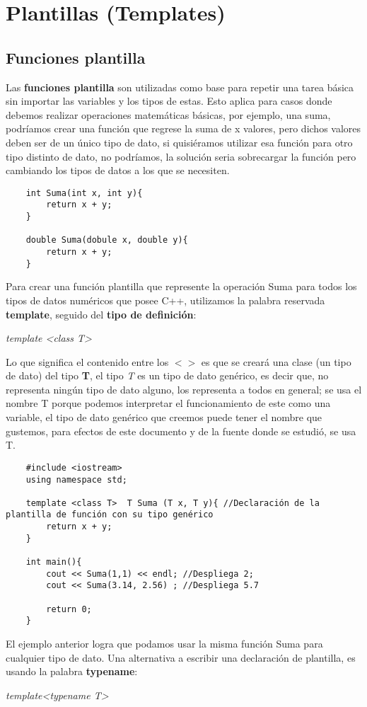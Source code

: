 \section{Plantillas (Templates)}

\subsection{Funciones plantilla}
Las \textbf{funciones plantilla} son utilizadas como base para repetir una tarea básica sin importar las variables y los tipos de estas. Esto aplica para casos donde debemos realizar operaciones matemáticas básicas, por ejemplo, una suma, podríamos crear una función que regrese la suma de x valores, pero dichos valores deben ser de un único tipo de dato, si quisiéramos utilizar esa función para otro tipo distinto de dato, no podríamos, la solución seria sobrecargar la función pero cambiando los tipos de datos a los que se necesiten.
\begin{lstlisting}
    int Suma(int x, int y){
        return x + y;
    }
    
    double Suma(dobule x, double y){
        return x + y;
    }
\end{lstlisting}
Para crear una función plantilla que represente la operación Suma para todos los tipos de datos numéricos que posee C++, utilizamos la palabra reservada \textbf{template}, seguido del \textbf{tipo de definición}:\begin{center}\textit{template <class T>}\end{center}
Lo que significa el contenido entre los \textbf{$< >$} es que se creará una clase (un tipo de dato) del tipo \textbf{T}, el tipo \textit{T} es un tipo de dato genérico, es decir que, no representa ningún tipo de dato alguno, los representa a todos en general; se usa el nombre T porque podemos interpretar el funcionamiento de este como una variable, el tipo de dato genérico que creemos puede tener el nombre que gustemos, para efectos de este documento y de la fuente donde se estudió, se usa T.
\begin{lstlisting}
    #include <iostream>
    using namespace std;
    
    template <class T>  T Suma (T x, T y){ //Declaración de la plantilla de función con su tipo genérico
        return x + y;
    }
    
    int main(){
        cout << Suma(1,1) << endl; //Despliega 2;
        cout << Suma(3.14, 2.56) ; //Despliega 5.7
        
        return 0;
    }
\end{lstlisting}
El ejemplo anterior logra que podamos usar la misma función Suma para cualquier tipo de dato. Una alternativa a escribir una declaración de plantilla, es usando la palabra \textbf{typename}:\begin{center}\textit{template<typename T>}\end{center}

